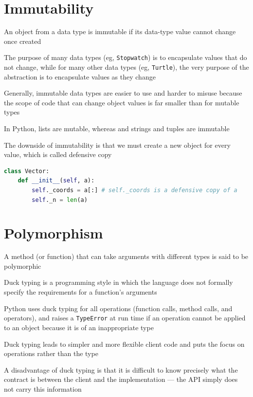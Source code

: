 \documentclass[8pt,a4paper,compress]{beamer}
\begin{document}
\section{Immutability}
\begin{frame}[fragile]
\pause

An object from a data type is immutable if its data-type value cannot change once created

\pause
\bigskip

The purpose of many data types (eg, \lstinline{Stopwatch}) is to encapsulate values that do not change, while for many other data types (eg, \lstinline{Turtle}), the very purpose of the abstraction is to encapsulate values as they change 

\pause
\bigskip

Generally, immutable data types are easier to use and harder to misuse because the scope of code that can change object values is far smaller than for mutable types

\pause
\bigskip

In Python, lists are mutable, whereas and strings and tuples are immutable

\pause
\bigskip

The downside of immutability is that we must create a new object for every value, which is called defensive copy

\begin{lstlisting}[language=Python]
class Vector:
    def __init__(self, a):
        self._coords = a[:] # self._coords is a defensive copy of a
        self._n = len(a)
\end{lstlisting}
\end{frame}

\section{Polymorphism}
\begin{frame}[fragile]
\pause

A method (or function) that can take arguments with different types is said to be polymorphic

\pause
\bigskip

Duck typing is a programming style in which the language does not formally specify the requirements for a function's arguments

\pause
\bigskip

Python uses duck typing for all operations (function calls, method calls, and operators), and raises a \lstinline{TypeError} at run time if an operation cannot be applied to an object because it is of an inappropriate type

\pause
\bigskip

Duck typing leads to simpler and more flexible client code and puts the focus on operations rather than the type

\pause
\bigskip

A disadvantage of duck typing is that it is difficult to know precisely what the contract is between the client and the implementation --- the API simply does not carry this information
\end{frame}
\end{document}
